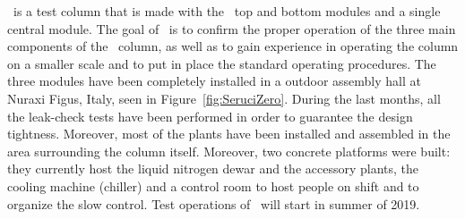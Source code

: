 \SeruciZero\ is a  test column that is made with the  \SeruciOne\ top and bottom modules and  a single central module.  The goal  of \SeruciZero\ is  to confirm the proper operation of the three main components of the \SeruciOne\ column, as well as to gain experience in operating the column on a smaller scale and to put in place the standard operating procedures.  The three modules have been completely installed in a outdoor assembly hall at Nuraxi Figus, Italy, seen in Figure~\ref{fig:SeruciZero}.  During the last months, all  the leak-check tests have been performed in order to guarantee the design tightness. Moreover, most of the plants have been installed and assembled in the area surrounding the column itself.  Moreover, two concrete platforms were built: they currently host the liquid nitrogen dewar and the accessory plants, the cooling machine (chiller) and a control room to  host people on shift and to organize the slow control.  Test operations of \SeruciZero\ will start in summer of 2019.

